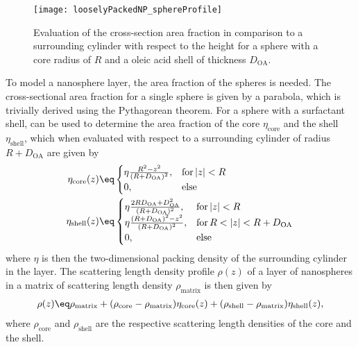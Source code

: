 \documentclass[\main/dresen_thesis.tex]{subfiles}
\begin{document}
    \begin{figure}[!htbp]
      \centering
      \texttt{[image: looselyPackedNP\_sphereProfile]}
      \caption{\label{fig:looselyPackedNP:layerCharacterization:sphereProfile}Evaluation of the cross-section area fraction in comparison to a surrounding cylinder with respect to the height for a sphere with a core radius of $R$ and a oleic acid shell of thickness $D_\mathrm{OA}$.}
    \end{figure}
    To model a nanosphere layer, the area fraction of the spheres is needed.
    The cross-sectional area fraction for a single sphere is given by a parabola, which is trivially derived using the Pythagorean theorem.
    For a sphere with a surfactant shell,  can be used to determine the area fraction of the core $\eta_\mathrm{core}$ and the shell $\eta_\mathrm{shell}$, which when evaluated with respect to a surrounding cylinder of radius $R + D_\mathrm{OA}$ are given by
    \begin{align}
      \eta_\mathrm{core} (z)
                &\eq \begin{cases}
                \eta \frac{R^{2} - z^2}{(R+D_\mathrm{OA})^2}, &\mathrm{for\,}|z|<R \\
                0,                                            &\mathrm{else}
                \end{cases}\\
      \eta_\mathrm{shell} (z)
        &\eq \begin{cases}
          \eta \frac{2 R D_\mathrm{OA} + D_\mathrm{OA}^2}{(R+D_\mathrm{OA})^2}, &\mathrm{for\,}|z|<R \\
          \eta \frac{(R + D_\mathrm{OA})^2 - z^2}{(R+D_\mathrm{OA})^2}, &\mathrm{for\,}R<|z|<R+D_\mathrm{OA} \\
          0,                                            &\mathrm{else}
        \end{cases}
    \end{align}
    where $\eta$ is then the two-dimensional packing density of the surrounding cylinder in the layer.
    The scattering length density profile $\rho(z)$ of a layer of nanospheres in a matrix of scattering length density $\rho_\mathrm{matrix}$ is then given by
    \begin{align}
      \label{eq:looselyPackedNP:layerCharacterization:sldFromAreaFraction}
      \rho(z) \eq \rho_\mathrm{matrix} + (\rho_\mathrm{core} - \rho_\mathrm{matrix}) \eta_\mathrm{core}(z) + (\rho_\mathrm{shell} - \rho_\mathrm{matrix}) \eta_\mathrm{shell}(z),
    \end{align}
    where $\rho_\mathrm{core}$ and $\rho_\mathrm{shell}$ are the respective scattering length densities of the core and the shell.
\end{document}
